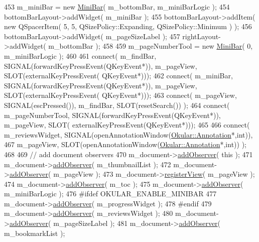 \begin{DoxyCode}
{453     m\_miniBar = \textcolor{keyword}{new} \hyperlink{classMiniBar}{MiniBar}( m\_bottomBar, m\_miniBarLogic );
454     bottomBarLayout->addWidget( m\_miniBar );
455     bottomBarLayout->addItem( \textcolor{keyword}{new} QSpacerItem( 5, 5, QSizePolicy::Expanding, QSizePolicy::Minimum ) );
456     bottomBarLayout->addWidget( m\_pageSizeLabel );
457     rightLayout->addWidget( m\_bottomBar );
458 
459     m\_pageNumberTool = \textcolor{keyword}{new} \hyperlink{classMiniBar}{MiniBar}( 0, m\_miniBarLogic );
460 
461     connect( m\_findBar, SIGNAL(forwardKeyPressEvent(QKeyEvent*)), m\_pageView, SLOT(externalKeyPressEvent(
      QKeyEvent*)));
462     connect( m\_miniBar, SIGNAL(forwardKeyPressEvent(QKeyEvent*)), m\_pageView, SLOT(externalKeyPressEvent(
      QKeyEvent*)));
463     connect( m\_pageView, SIGNAL(escPressed()), m\_findBar, SLOT(resetSearch()) );
464     connect( m\_pageNumberTool, SIGNAL(forwardKeyPressEvent(QKeyEvent*)), m\_pageView, SLOT(
      externalKeyPressEvent(QKeyEvent*)));
465 
466     connect( m\_reviewsWidget, SIGNAL(openAnnotationWindow(\hyperlink{classOkular_1_1Annotation}{Okular::Annotation}*,\textcolor{keywordtype}{int})),
467         m\_pageView, SLOT(openAnnotationWindow(\hyperlink{classOkular_1_1Annotation}{Okular::Annotation}*,\textcolor{keywordtype}{int})) );
468 
469     \textcolor{comment}{// add document observers}
470     m\_document->\hyperlink{classOkular_1_1Document_a37300860cf93f60184305829b033e0e2}{addObserver}( \textcolor{keyword}{this} );
471     m\_document->\hyperlink{classOkular_1_1Document_a37300860cf93f60184305829b033e0e2}{addObserver}( m\_thumbnailList );
472     m\_document->\hyperlink{classOkular_1_1Document_a37300860cf93f60184305829b033e0e2}{addObserver}( m\_pageView );
473     m\_document->\hyperlink{classOkular_1_1Document_a92956a4adc2ebbf3c346204655e2a8a1}{registerView}( m\_pageView );
474     m\_document->\hyperlink{classOkular_1_1Document_a37300860cf93f60184305829b033e0e2}{addObserver}( m\_toc );
475     m\_document->\hyperlink{classOkular_1_1Document_a37300860cf93f60184305829b033e0e2}{addObserver}( m\_miniBarLogic );
476 \textcolor{preprocessor}{#ifdef OKULAR\_ENABLE\_MINIBAR}
477     m\_document->\hyperlink{classOkular_1_1Document_a37300860cf93f60184305829b033e0e2}{addObserver}( m\_progressWidget );
478 \textcolor{preprocessor}{#endif}
479     m\_document->\hyperlink{classOkular_1_1Document_a37300860cf93f60184305829b033e0e2}{addObserver}( m\_reviewsWidget );
480     m\_document->\hyperlink{classOkular_1_1Document_a37300860cf93f60184305829b033e0e2}{addObserver}( m\_pageSizeLabel );
481     m\_document->\hyperlink{classOkular_1_1Document_a37300860cf93f60184305829b033e0e2}{addObserver}( m\_bookmarkList );
}
\end{DoxyCode}
